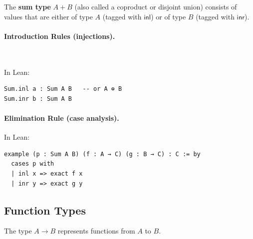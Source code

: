 The \textbf{sum type} $A + B$ (also called a coproduct or disjoint
union) consists of values that are either of type $A$ (tagged with
$\mathsf{inl}$) or of type $B$ (tagged with $\mathsf{inr}$).

\paragraph{Introduction Rules (injections).}\mbox{}\\[0.5em]
\noindent
\begin{minipage}[t]{0.48\textwidth}
  \vspace{0pt}
  \begin{prooftree}
  \end{prooftree}
\end{minipage}\hfill
\begin{minipage}[t]{0.48\textwidth}
  \vspace{0pt}
  \begin{prooftree}
  \end{prooftree}
\end{minipage}

\noindent In Lean:
\begin{lstlisting}[language=lean]
Sum.inl a : Sum A B   -- or A ⊕ B
Sum.inr b : Sum A B
\end{lstlisting}

\paragraph{Elimination Rule (case analysis).}
\begin{prooftree}
\end{prooftree}

\noindent In Lean:
\begin{lstlisting}[language=lean]
example (p : Sum A B) (f : A → C) (g : B → C) : C := by
  cases p with
  | inl x => exact f x
  | inr y => exact g y
\end{lstlisting}

\subsection*{Function Types}

The type $A \to B$ represents functions from $A$ to $B$.


